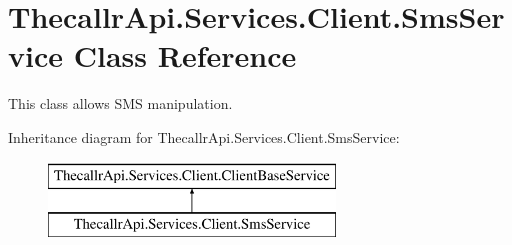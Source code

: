 \hypertarget{class_thecallr_api_1_1_services_1_1_client_1_1_sms_service}{\section{Thecallr\+Api.\+Services.\+Client.\+Sms\+Service Class Reference}
\label{class_thecallr_api_1_1_services_1_1_client_1_1_sms_service}
}


This class allows S\+M\+S manipulation.  


Inheritance diagram for Thecallr\+Api.\+Services.\+Client.\+Sms\+Service\+:\begin{figure}[H]
\begin{center}
\leavevmode
\includegraphics[height=2.000000cm]{class_thecallr_api_1_1_services_1_1_client_1_1_sms_service}
\end{center}
\end{figure}
